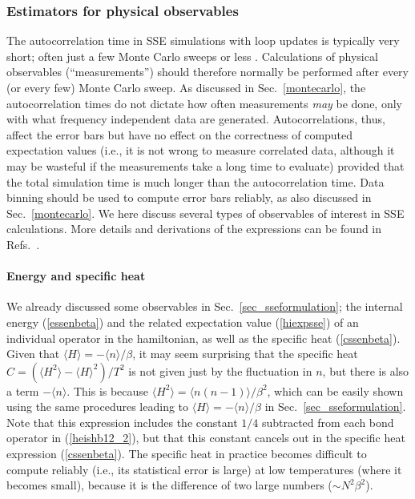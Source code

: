 \documentclass[draft,numberedheadings]{aipproc}
\begin{document}
\subsubsection{Estimators for physical observables}
\label{estimators}

The autocorrelation time in SSE simulations with loop updates is typically very short; often just a few Monte Carlo sweeps or less \cite{syljuasen02,evertz1}.
Calculations of physical observables (``measurements'') should therefore normally be performed after every (or every few) Monte Carlo sweep. As discussed in
Sec.~\ref{montecarlo}, the autocorrelation times do not dictate how often measurements {\it may} be done, only with what frequency independent data are
generated. Autocorrelations, thus, affect the error bars but have no effect on the correctness of computed expectation values (i.e., it is not wrong to measure 
correlated data, although it may be wasteful if the measurements take a long time to evaluate) provided that the total simulation time is much longer than the 
autocorrelation time. Data binning should be used to compute error bars reliably, as also discussed in Sec.~\ref{montecarlo}. We here discuss several types of 
observables of interest in SSE calculations. More details and derivations of the expressions can be found in Refs.~\cite{sandvik90,sandvik92,sandvik97b}.

\paragraph{Energy and specific heat}

We already discussed some observables in Sec.~\ref{sec_sseformulation}; the internal energy (\ref{essenbeta}) and the related expectation value (\ref{hiexpsse})
of an individual operator in the hamiltonian, as well as the specific heat (\ref{cssenbeta}). Given that $\langle H\rangle=-\langle n\rangle/\beta$, it 
may seem surprising that the specific heat $C=(\langle H^2\rangle-\langle H\rangle^2)/T^2$ is not given just by the fluctuation in $n$, but there is also a 
term $-\langle n\rangle$. This is because $\langle H^2\rangle=\langle n(n-1)\rangle/\beta^2$, which can be easily shown using the same procedures leading to 
$\langle H\rangle=-\langle n\rangle/\beta$ in Sec.~\ref{sec_sseformulation}. Note that this expression includes the constant $1/4$ subtracted from each 
bond operator in (\ref{heishb12_2}), but that this constant cancels out in the specific heat expression (\ref{cssenbeta}). The specific heat in practice
becomes difficult to compute reliably (i.e., its statistical error is large) at low temperatures (where it becomes small), because it is the difference 
of two large numbers ($\sim N^2\beta^2$).
\end{document}
